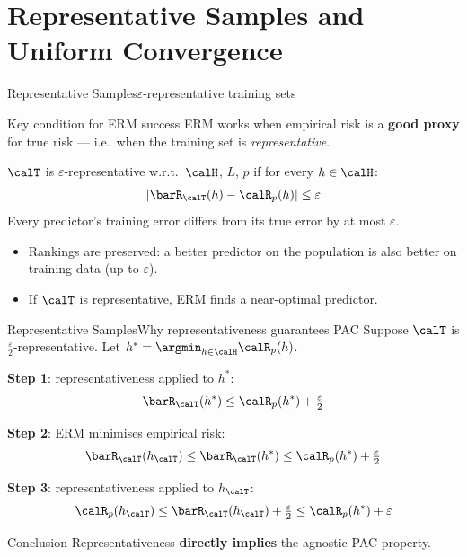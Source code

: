 \section{Representative Samples and Uniform Convergence}

\begin{frame}{Representative Samples}{$\varepsilon$-representative training sets}
  \begin{block}{Key condition for ERM success}
    ERM works when empirical risk is a \textbf{good proxy} for true risk — i.e.\ when the
    training set is \emph{representative}.
  \end{block}
  \bigskip
  \begin{mydefinition}
    $\calT$ is $\varepsilon$-representative w.r.t.\ $\calH$, $L$, $p$ if for every
    $h \in \calH$:
    \[
      \left|\barR_\calT(h) - \calR_p(h)\right| \leq \varepsilon
    \]
    Every predictor's training error differs from its true error by at most $\varepsilon$.
  \end{mydefinition}
  \bigskip
  \begin{itemize}
    \item Rankings are preserved: a better predictor on the population is also better on
          training data (up to $\varepsilon$).
    \item If $\calT$ is representative, ERM finds a near-optimal predictor.
  \end{itemize}
\end{frame}

\begin{frame}{Representative Samples}{Why representativeness guarantees PAC}
  Suppose $\calT$ is $\frac{\varepsilon}{2}$-representative. Let
  $h^* = \argmin_{h\in\calH}\calR_p(h)$.

  \medskip
  \textbf{Step 1}: representativeness applied to $h^*$:
  \[
    \barR_\calT(h^*) \leq \calR_p(h^*) + \tfrac{\varepsilon}{2}
  \]

  \textbf{Step 2}: ERM minimises empirical risk:
  \[
    \barR_\calT(h_\calT) \leq \barR_\calT(h^*) \leq \calR_p(h^*) + \tfrac{\varepsilon}{2}
  \]

  \textbf{Step 3}: representativeness applied to $h_\calT$:
  \[
    \calR_p(h_\calT) \leq \barR_\calT(h_\calT) + \tfrac{\varepsilon}{2}
    \leq \calR_p(h^*) + \varepsilon
  \]

  \begin{block}{Conclusion}
    Representativeness \textbf{directly implies} the agnostic PAC property.
  \end{block}
\end{frame}

